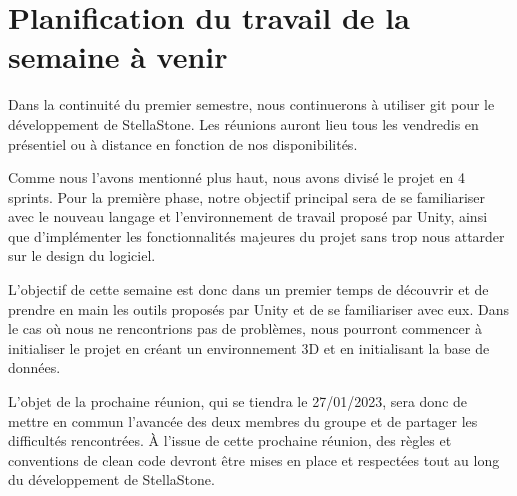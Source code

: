 \documentclass[a4paper, 12pt]{article}
\begin{document}
\section{Planification du travail de la semaine à venir}

Dans la continuité du premier semestre, nous continuerons à utiliser git pour le développement de StellaStone. Les réunions auront lieu tous les vendredis en présentiel ou à distance en fonction de nos disponibilités. 

Comme nous l'avons mentionné plus haut, nous avons divisé le projet en 4 sprints. Pour la première phase, notre objectif principal sera de se familiariser avec le nouveau langage et l'environnement de travail proposé par Unity, ainsi que d'implémenter les fonctionnalités majeures du projet sans trop nous attarder sur le design du logiciel.

L'objectif de cette semaine est donc dans un premier temps de découvrir et de prendre en main les outils proposés par Unity et de se familiariser avec eux. Dans le cas où nous ne rencontrions pas de problèmes, nous pourront commencer à initialiser le projet en créant un environnement 3D et en initialisant la base de données. 

L'objet de la prochaine réunion, qui se tiendra le 27/01/2023, sera donc de mettre en commun l'avancée des deux membres du groupe et de partager les difficultés rencontrées. À l'issue de cette prochaine réunion, des règles et conventions de clean code devront être mises en place et respectées tout au long du développement de StellaStone.
\end{document}
